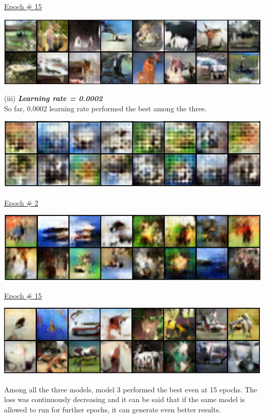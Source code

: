 \documentclass{exam}
\begin{document}
\underline{Epoch \# 15}
\begin{center}
	\includegraphics[scale=0.7]{../assets/model-2-3}
\end{center}

\pagebreak

(iii) \textbf{\textit{Learning rate = 0.0002}}\\

So far, 0.0002 learning rate performed the best among the three.

\begin{center}
	\includegraphics[scale=0.7]{../assets/model-3-1}
\end{center}

\underline{Epoch \# 2}
\begin{center}
	\includegraphics[scale=0.7]{../assets/model-3-2}
\end{center}


\underline{Epoch \# 15}
\begin{center}
	\includegraphics[scale=0.7]{../assets/model-3-3}
\end{center}

Among all the three models, model 3 performed the best even at 15 epochs. The loss was continuously decreasing and it can be said that if the same model is allowed to run for further epochs, it can generate even better results. 
\end{document}
